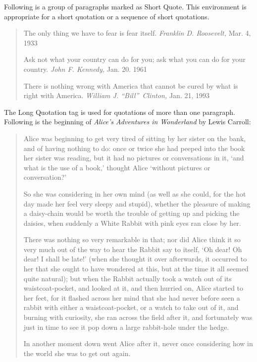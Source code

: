 \documentclass[aps,preprint]{revtex4}%
\begin{document}
Following is a group of paragraphs marked as Short Quote. This environment is
appropriate for a short quotation or a sequence of short quotations.

\begin{quote}
The only thing we have to fear is fear itself. \emph{Franklin D. Roosevelt,
}Mar. 4, 1933

Ask not what your country can do for you; ask what you can do for your
country. \emph{John F. Kennedy, }Jan. 20. 1961

There is nothing wrong with America that cannot be cured by what is right with
America. \emph{William J. \textquotedblleft Bill\textquotedblright\ Clinton,
}Jan. 21, 1993
\end{quote}

The Long Quotation tag is used for quotations of more than one paragraph.
Following is the beginning of \emph{Alice's Adventures in Wonderland }by Lewis Carroll:

\begin{quotation}
Alice was beginning to get very tired of sitting by her sister on the bank,
and of having nothing to do: once or twice she had peeped into the book her
sister was reading, but it had no pictures or conversations in it, `and what
is the use of a book,' thought Alice `without pictures or conversation?'

So she was considering in her own mind (as well as she could, for the hot day
made her feel very sleepy and stupid), whether the pleasure of making a
daisy-chain would be worth the trouble of getting up and picking the daisies,
when suddenly a White Rabbit with pink eyes ran close by her.

There was nothing so very remarkable in that; nor did Alice think it so very
much out of the way to hear the Rabbit say to itself, `Oh dear! Oh dear! I
shall be late!' (when she thought it over afterwards, it occurred to her that
she ought to have wondered at this, but at the time it all seemed quite
natural); but when the Rabbit actually took a watch out of its
waistcoat-pocket, and looked at it, and then hurried on, Alice started to her
feet, for it flashed across her mind that she had never before seen a rabbit
with either a waistcoat-pocket, or a watch to take out of it, and burning with
curiosity, she ran across the field after it, and fortunately was just in time
to see it pop down a large rabbit-hole under the hedge.

In another moment down went Alice after it, never once considering how in the
world she was to get out again.
\end{quotation}
\end{document}
